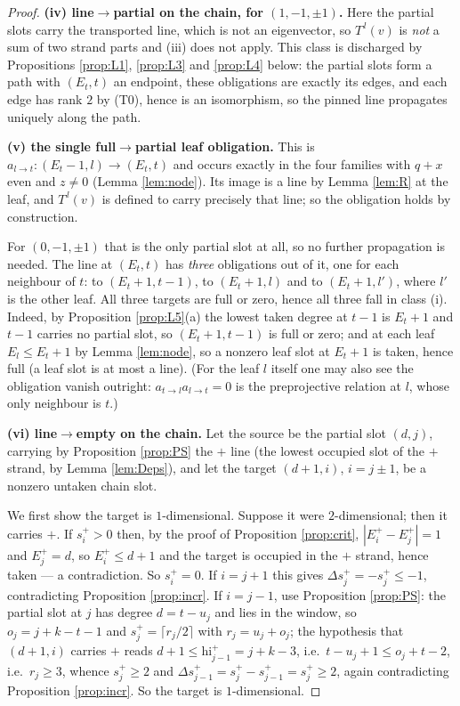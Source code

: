 \documentclass[reqno]{amsart}
\theoremstyle{plain}
\theoremstyle{definition}
\newcommand{\hi}{\mathrm{hi}}
\begin{document}
\begin{proof}
\smallskip\noindent
\textbf{(iv) line$\to$partial on the chain, for $(1,-1,\pm1)$.}  Here the
partial slots carry the transported line, which is not an eigenvector, so
$T^{\,l}(v)$ is \emph{not} a sum of two strand parts and (iii) does not apply.
This class is discharged by Propositions \ref{prop:L1}, \ref{prop:L3} and
\ref{prop:L4} below: the partial slots form a path with $(E_t,t)$ an endpoint,
these obligations are exactly its edges, and each edge has rank $2$ by (T0),
hence is an isomorphism, so the pinned line propagates uniquely along the path.

\smallskip\noindent
\textbf{(v) the single full$\to$partial leaf obligation.}  This is
$a_{l\to t}:(E_t-1,l)\to(E_t,t)$ and occurs exactly in the four families with
$q+x$ even and $z\ne0$ (Lemma \ref{lem:node}).  Its image is a line by Lemma
\ref{lem:R} at the leaf, and $T^{\,l}(v)$ is defined to carry precisely that
line; so the obligation holds by construction.

For $(0,-1,\pm1)$ that is the only partial slot at all, so no further
propagation is needed.  The line at $(E_t,t)$ has \emph{three} obligations out
of it, one for each neighbour of $t$: to $(E_t+1,t-1)$, to $(E_t+1,l)$ and to
$(E_t+1,l')$, where $l'$ is the other leaf.  All three targets are full or
zero, hence all three fall in class (i).  Indeed, by Proposition
\ref{prop:L5}(a) the lowest taken degree at $t-1$ is $E_t+1$ and $t-1$ carries
no partial slot, so $(E_t+1,t-1)$ is full or zero; and at each leaf $E_{l}\le
E_t+1$ by Lemma \ref{lem:node}, so a nonzero leaf slot at $E_t+1$ is taken,
hence full (a leaf slot is at most a line).  (For the leaf $l$ itself one may
also see the obligation vanish outright: $a_{t\to l}a_{l\to t}=0$ is the
preprojective relation at $l$, whose only neighbour is $t$.)

\smallskip\noindent
\textbf{(vi) line$\to$empty on the chain.}  Let the source be the partial slot
$(d,j)$, carrying by Proposition \ref{prop:PS} the $+$ line (the lowest
occupied slot of the $+$ strand, by Lemma \ref{lem:Deps}), and let the target
$(d+1,i)$, $i=j\pm1$, be a nonzero untaken chain slot.

We first show the target is $1$-dimensional.  Suppose it were
$2$-dimensional; then it carries $+$.  If $s^{+}_i>0$ then, by the proof of
Proposition \ref{prop:crit}, $|E^{+}_i-E^{+}_j|=1$ and $E^{+}_j=d$, so
$E^{+}_i\le d+1$ and the target is occupied in the $+$ strand, hence taken ---
a contradiction.  So $s^{+}_i=0$.  If $i=j+1$ this gives
$\Delta s^{+}_j=-s^{+}_j\le-1$, contradicting Proposition \ref{prop:incr}.  If
$i=j-1$, use Proposition \ref{prop:PS}: the partial slot at $j$ has degree
$d=t-u_j$ and lies in the window, so $o_j=j+k-t-1$ and $s^{+}_j=\lceil
r_j/2\rceil$ with $r_j=u_j+o_j$; the hypothesis that $(d+1,i)$ carries $+$
reads $d+1\le\hi^{+}_{j-1}=j+k-3$, i.e.\ $t-u_j+1\le o_j+t-2$, i.e.\
$r_j\ge3$, whence $s^{+}_j\ge2$ and $\Delta s^{+}_{j-1}=s^{+}_j-s^{+}_{j-1}
=s^{+}_j\ge2$, again contradicting Proposition \ref{prop:incr}.  So the target
is $1$-dimensional.


\end{proof}
\end{document}
